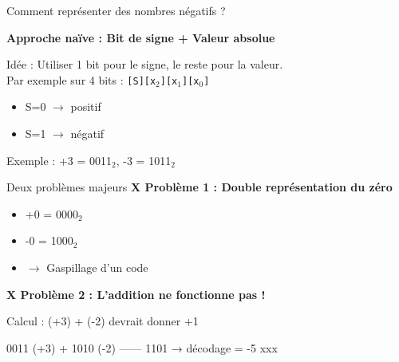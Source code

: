 \documentclass[aspectratio=1610]{beamer}
\begin{document}
\begin{frame}{Comment représenter des nombres négatifs ?}

  \textbf{Approche naïve : Bit de signe + Valeur absolue}

  \vspace{0.5em}

  Idée : Utiliser 1 bit pour le signe, le reste pour la valeur. \\
  Par exemple sur 4 bits : \texttt{[S][x$_2$][x$_1$][x$_0$]}
  \begin{itemize}
    \item S=0 $\rightarrow$ positif
    \item S=1 $\rightarrow$ négatif
  \end{itemize}

  Exemple : +3 = 0011$_2$, -3 = 1011$_2$

  \vspace{0.5em}

  \begin{alertblock}{Deux problèmes majeurs}
    \textbf{X Problème 1 : Double représentation du zéro}
    \begin{itemize}
      \item +0 = 0000$_2$
      \item -0 = 1000$_2$
      \item $\rightarrow$ Gaspillage d'un code
    \end{itemize}

    \textbf{X Problème 2 : L'addition ne fonctionne pas !}

    Calcul : (+3) + (-2) devrait donner +1
    \begin{semiverbatim}
     0011  (+3)
   + 1010  (-2)
   ------
     1101  → décodage = -5  xxx
    \end{semiverbatim}
  \end{alertblock}

\end{frame}
\end{document}
